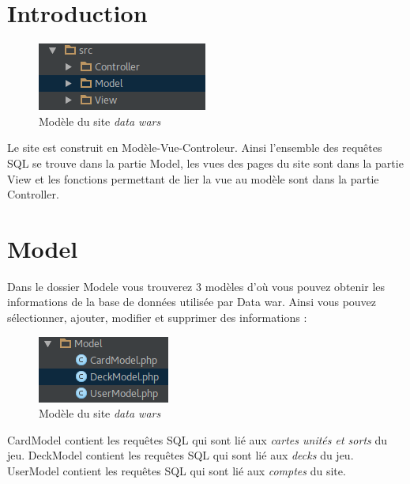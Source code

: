 \documentclass[a4paper, titlepage]{livret}
\begin{document}
\section{Introduction}

	\begin{figure}[th]
		\begin{center}
		\includegraphics[scale=0.4]{Assets/mvc.png}
      		\caption{Modèle du site \textit{data wars}}
      		\label{fig1}
     		\end{center}
	\end{figure}

	Le site est construit en Modèle-Vue-Controleur. Ainsi l'ensemble des requêtes SQL se trouve dans la partie Model, les vues des pages du site sont dans la partie View et les fonctions permettant de lier la vue au modèle sont dans la partie Controller.

\section{Model}
	Dans le dossier Modele vous trouverez 3 modèles d'où vous pouvez obtenir les informations de la base de données utilisée par Data war. Ainsi vous pouvez sélectionner, ajouter, modifier et supprimer des informations :

	\begin{figure}[th]
		\begin{center}
		\includegraphics[scale=0.4]{Assets/modele.png}
      		\caption{Modèle du site \textit{data wars}}
      		\label{fig2}
     		\end{center}
	\end{figure}
    
	CardModel contient les requêtes SQL qui sont lié aux \textit{cartes unités et sorts} du jeu.
	DeckModel contient les requêtes SQL qui sont lié aux \textit{decks} du jeu.
	UserModel contient les requêtes SQL qui sont lié aux \textit{comptes} du site.    
\end{document}
